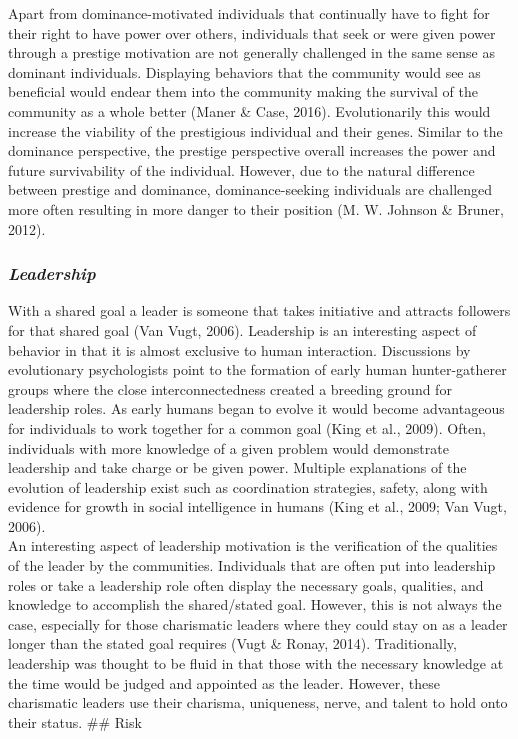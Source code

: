 \documentclass[
  donotrepeattitle,doc, 12pt, a4paper,floatsintext]{apa7}
\begin{document}
Apart from dominance-motivated individuals that continually have to fight for their right to have power over others, individuals that seek or were given power through a prestige motivation are not generally challenged in the same sense as dominant individuals. Displaying behaviors that the community would see as beneficial would endear them into the community making the survival of the community as a whole better (Maner \& Case, 2016). Evolutionarily this would increase the viability of the prestigious individual and their genes. Similar to the dominance perspective, the prestige perspective overall increases the power and future survivability of the individual. However, due to the natural difference between prestige and dominance, dominance-seeking individuals are challenged more often resulting in more danger to their position (M. W. Johnson \& Bruner, 2012).

\hypertarget{leadership}{%
\subsubsection{\texorpdfstring{\emph{Leadership}}{Leadership}}\label{leadership}}

With a shared goal a leader is someone that takes initiative and attracts followers for that shared goal (Van Vugt, 2006). Leadership is an interesting aspect of behavior in that it is almost exclusive to human interaction. Discussions by evolutionary psychologists point to the formation of early human hunter-gatherer groups where the close interconnectedness created a breeding ground for leadership roles. As early humans began to evolve it would become advantageous for individuals to work together for a common goal (King et al., 2009). Often, individuals with more knowledge of a given problem would demonstrate leadership and take charge or be given power. Multiple explanations of the evolution of leadership exist such as coordination strategies, safety, along with evidence for growth in social intelligence in humans (King et al., 2009; Van Vugt, 2006).\\

An interesting aspect of leadership motivation is the verification of the qualities of the leader by the communities. Individuals that are often put into leadership roles or take a leadership role often display the necessary goals, qualities, and knowledge to accomplish the shared/stated goal. However, this is not always the case, especially for those charismatic leaders where they could stay on as a leader longer than the stated goal requires (Vugt \& Ronay, 2014). Traditionally, leadership was thought to be fluid in that those with the necessary knowledge at the time would be judged and appointed as the leader. However, these charismatic leaders use their charisma, uniqueness, nerve, and talent to hold onto their status.
\#\# Risk
\end{document}
